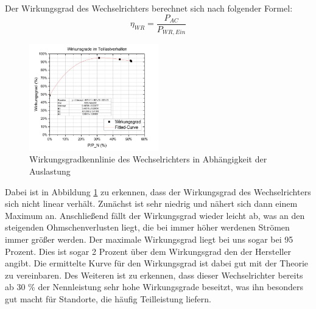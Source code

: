 Der Wirkungsgrad des Wechselrichters berechnet sich nach folgender Formel:
%
\begin{equation}
	\eta_{ WR} = \frac{ P_{AC} }{ P_{WR,Ein} }
\end{equation}
%
%
\begin{figure}[!h]
		\centering
		\includegraphics[width=0.5\textwidth]{Abbildungen/Kennlinie wr}
		\caption{Wirkungsgradkennlinie des Wechselrichters in Abhängigkeit der Auslastung}
		\label{fig:WRkennlinie}
\end{figure}
%
Dabei ist in Abbildung \ref{fig:WRkennlinie} zu erkennen, dass der Wirkungsgrad des Wechselrichters sich nicht linear verhält. Zunächst ist sehr niedrig und nähert sich dann einem Maximum an. Anschließend fällt der Wirkungsgrad wieder leicht ab, was an den steigenden Ohmschenverlusten liegt, die bei immer höher werdenen Strömen immer größer werden. Der maximale Wirkungsgrad liegt bei uns sogar bei 95 Prozent. Dies ist sogar 2 Prozent über dem Wirkungsgrad den der Hersteller angibt. Die ermittelte Kurve für den Wirkungsgrad ist dabei gut mit der Theorie zu vereinbaren. Des Weiteren ist zu erkennen, dass dieser Wechselrichter bereits ab 30 \% der Nennleistung sehr hohe Wirkungsgrade beseitzt, was ihn besonders gut macht für Standorte, die häufig Teilleistung liefern.
